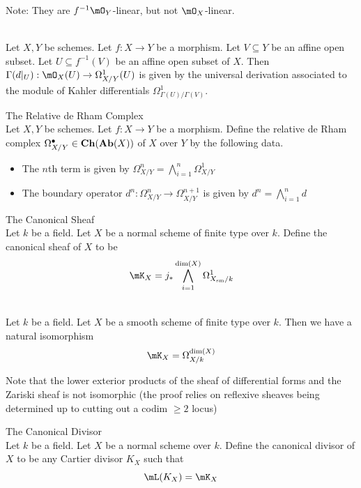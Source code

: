\documentclass[a4paper]{article}
\begin{document}
Note: They are $f^{-1}\mO_Y$-linear, but not $\mO_X$-linear. 

\begin{lmm}{}{}\\
Let $X,Y$ be schemes. Let $f:X\to Y$ be a morphism. Let $V\subseteq Y$ be an affine open subset. Let $U\subseteq f^{-1}(V)$ be an affine open subset of $X$. Then $\Gamma(d|_U):\mO_X(U)\to\Omega_{X/Y}^1(U)$ is given by the universal derivation associated to the module of Kahler differentials $\Omega_{\Gamma(U)/\Gamma(V)}^1$. 
\end{lmm}

\begin{defn}{The Relative de Rham Complex}{}\\
Let $X,Y$ be schemes. Let $f:X\to Y$ be a morphism. Define the relative de Rham complex $\Omega_{X/Y}^\bullet\in\bold{Ch}(\bold{Ab}(X))$ of $X$ over $Y$ by the following data. 
\begin{itemize}
\item The $n$th term is given by $\Omega_{X/Y}^n=\bigwedge_{i=1}^n\Omega_{X/Y}^1$
\item The boundary operator $d^n:\Omega_{X/Y}^n\to\Omega_{X/Y}^{n+1}$ is given by $d^n=\bigwedge_{i=1}^nd$
\end{itemize}
\end{defn}

\begin{defn}{The Canonical Sheaf}{}\\
Let $k$ be a field. Let $X$ be a normal scheme of finite type over $k$. Define the canonical sheaf of $X$ to be $$\mK_X=j_\ast\bigwedge_{i=1}^{\dim(X)}\Omega_{X_\text{sm}/k}^1$$
\end{defn}

\begin{prp}{}{}\\
Let $k$ be a field. Let $X$ be a smooth scheme of finite type over $k$. Then we have a natural isomorphism $$\mK_X=\Omega_{X/k}^{\dim(X)}$$
\end{prp}

Note that the lower exterior products of the sheaf of differential forms and the Zariski sheaf is not isomorphic (the proof relies on reflexive sheaves being determined up to cutting out a codim $\geq 2$ locus)

\begin{defn}{The Canonical Divisor}{}\\
Let $k$ be a field. Let $X$ be a normal scheme over $k$. Define the canonical divisor of $X$ to be any Cartier divisor $K_X$ such that $$\mL(K_X)=\mK_X$$
\end{defn}
\end{document}
